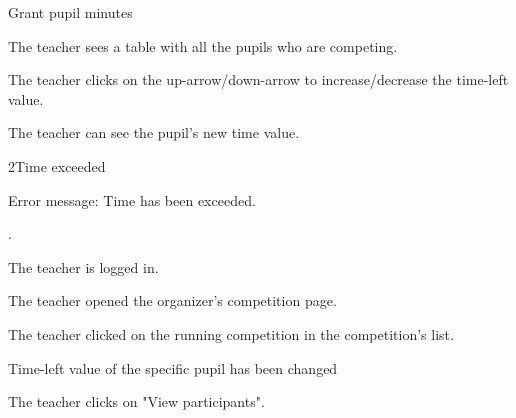 \begin{uc}{Grant pupil minutes}

    \begin{uc-mss}
    \item The teacher sees a table with all the pupils who are competing.
    \item The teacher clicks on the up-arrow/down-arrow to increase/decrease the time-left value.
    \item The teacher can see the pupil's new time value.
    \end{uc-mss}

    \begin{uc-ext}
        \begin{uc-fail}{2}{Time exceeded}
        \item Error message: Time has been exceeded.
        \item {}.
        \end{uc-fail}
    \end{uc-ext}

    \begin{uc-pre}
    	\item The teacher is logged in.
    	\item The teacher opened the organizer's competition page.
	\item The teacher clicked on the running competition in the competition's list.
    \end{uc-pre}

    \begin{uc-post}
    \item Time-left value of the specific pupil has been changed
    \end{uc-post}

    \begin{uc-trig}
        The teacher clicks on "View participants".
    \end{uc-trig}

\end{uc}

